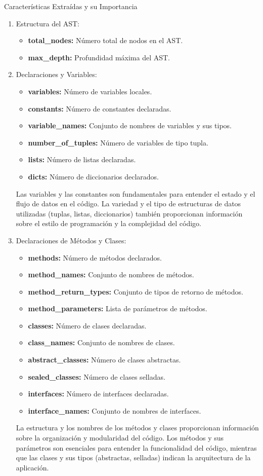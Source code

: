 Características Extraídas y su Importancia


\begin{enumerate}
	\item Estructura del AST:
    		\begin{itemize}
			\item {\bf total\_nodes:} Número total de nodos en el AST.
			\item {\bf max\_depth:} Profundidad máxima del AST.
		\end{itemize}
		
	 \item Declaraciones y Variables:
    \begin{itemize}
        \item {\bf variables:} Número de variables locales.
        \item {\bf constants:} Número de constantes declaradas.
        \item {\bf variable\_names:} Conjunto de nombres de variables y sus tipos.
        \item {\bf number\_of\_tuples:} Número de variables de tipo tupla.
        \item {\bf lists:} Número de listas declaradas.
        \item {\bf dicts:} Número de diccionarios declarados.
    \end{itemize}
    Las variables y las constantes son fundamentales para entender el estado y el flujo de datos en el código. La variedad y el tipo de estructuras de datos utilizadas (tuplas, listas, diccionarios) también proporcionan información sobre el estilo de programación y la complejidad del código.

    \item Declaraciones de Métodos y Clases:
    \begin{itemize}
        \item {\bf methods:} Número de métodos declarados.
        \item {\bf method\_names:} Conjunto de nombres de métodos.
        \item {\bf method\_return\_types:} Conjunto de tipos de retorno de métodos.
        \item {\bf method\_parameters:} Lista de parámetros de métodos.
        \item {\bf classes:} Número de clases declaradas.
        \item {\bf class\_names:} Conjunto de nombres de clases.
        \item {\bf abstract\_classes:} Número de clases abstractas.
        \item {\bf sealed\_classes:} Número de clases selladas.
        \item {\bf interfaces:} Número de interfaces declaradas.
        \item {\bf interface\_names:} Conjunto de nombres de interfaces.
    \end{itemize}
    La estructura y los nombres de los métodos y clases proporcionan información sobre la organización y modularidad del código. Los métodos y sus parámetros son esenciales para entender la funcionalidad del código, mientras que las clases y sus tipos (abstractas, selladas) indican la arquitectura de la aplicación.


\end{enumerate}
